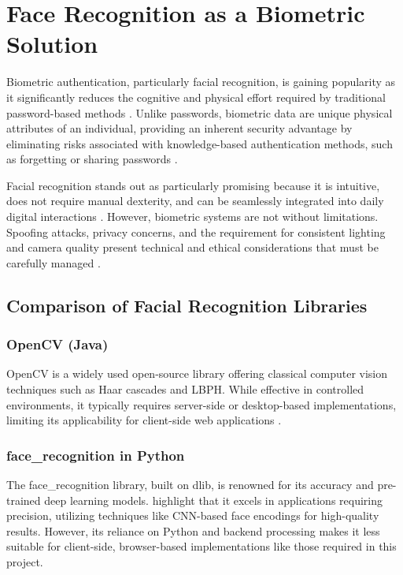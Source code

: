 \section{Face Recognition as a Biometric Solution}
Biometric authentication, particularly facial recognition, is gaining popularity as it significantly reduces the cognitive and physical effort required by traditional password-based methods \autocite{Furnell2022}. 
Unlike passwords, biometric data are unique physical attributes of an individual, providing an inherent security advantage by eliminating risks associated with knowledge-based authentication methods, 
such as forgetting or sharing passwords \autocite{Pant2022}.

Facial recognition stands out as particularly promising because it is intuitive, does not require manual dexterity, and can be seamlessly integrated into daily digital interactions \autocite{Bhatt2011}. However, biometric systems are not without limitations. Spoofing attacks, privacy concerns, and the requirement for consistent lighting and camera quality present technical and ethical considerations that must be carefully managed \autocite{Kuznetsov2024, Bahia2024}.


\subsection{Comparison of Facial Recognition Libraries}

\subsubsection{OpenCV (Java)}
OpenCV is a widely used open-source library offering classical computer vision techniques such as Haar cascades and LBPH. While effective in controlled environments, it typically requires server-side or desktop-based implementations, limiting its applicability for client-side web applications \autocite{Dominguez2017}.

\subsubsection{face\_recognition in Python}  
The face\_recognition library, built on dlib, is renowned for its accuracy and pre-trained deep learning models. \textcite{Zhang2020} highlight that it excels in applications requiring precision, utilizing techniques like CNN-based face encodings for high-quality results. However, its reliance on Python and backend processing makes it less suitable for client-side, browser-based implementations like those required in this project.

